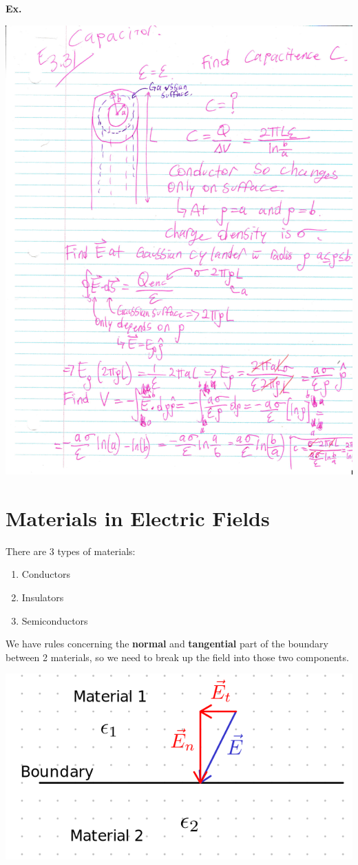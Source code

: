 \documentclass[12pt,letterpaper]{article} \usepackage{amsmath} \usepackage{graphicx} \usepackage[margin=1in]{geometry} \usepackage{longtable}  \usepackage{amssymb}
\begin{document}
	\begin{mdframed}
		\textbf{Ex. }
		\begin{center}
			\includegraphics[width=0.9\linewidth]{cap-ex}
		\end{center}
		
	\end{mdframed}
	
	\section{Materials in Electric Fields}
	There are 3 types of materials:
	\begin{enumerate}[]
		\item Conductors
		\item Insulators
		\item Semiconductors
	\end{enumerate}

	We have rules concerning the \textbf{normal} and \textbf{tangential} part of the boundary between 2 materials, so we need to break up the field into those two components. 
	
	\begin{center}
		\includegraphics[width=0.55\linewidth]{boundary-conditions-E}
	\end{center}
	
\end{document}
